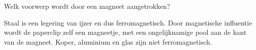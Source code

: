 \documentclass{ximera}
\begin{document}
\begin{question}
    Welk voorwerp wordt door een magneet aangetrokken?

    \begin{multipleChoice}
    \end{multipleChoice}

    \begin{solution}\nl
        Staal is een legering van ijzer en dus ferromagnetisch. Door magnetische influentie wordt de paperclip zelf een magneetje, met een ongelijknamige pool aan de kant van de magneet. Koper, aluminium en glas zijn niet ferromagnetisch.
    \end{solution}
\end{question}
\end{document}
